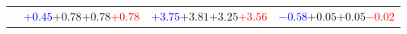 \documentclass[compress]{beamer}
\begin{document}
\begin{frame}
\begin{tabular}{r | c | c | c}
          & \textcolor{blue}{$+0.45$}\hspace{0.1 cm}$+0.78$\hspace{0.1 cm}$+0.78$\hspace{0.1 cm}\textcolor{red}{$+0.78$} & \textcolor{blue}{$+3.75$}\hspace{0.1 cm}$+3.81$\hspace{0.1 cm}$+3.25$\hspace{0.1 cm}\textcolor{red}{$+3.56$} & \textcolor{blue}{$-0.58$}\hspace{0.1 cm}$+0.05$\hspace{0.1 cm}$+0.05$\hspace{0.1 cm}\textcolor{red}{$-0.02$} \\
\end{tabular}
\end{frame}
\end{document}

